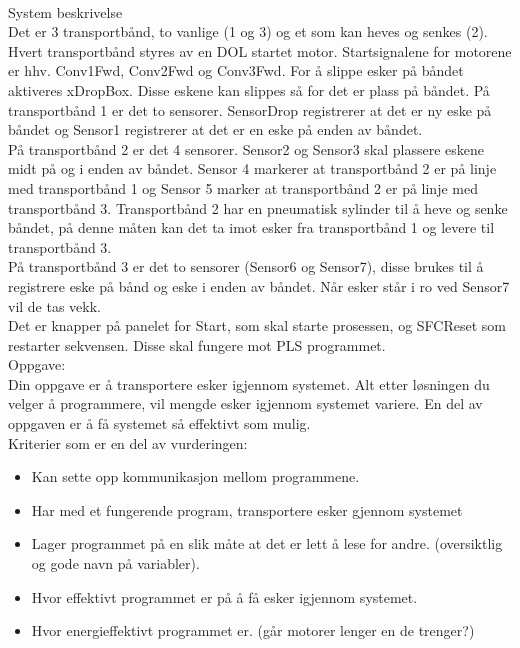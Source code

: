 

\\[0.3cm]
System beskrivelse\\[0.3cm]

Det er 3 transportbånd, to vanlige (1 og 3) og et som kan heves og senkes (2). Hvert transportbånd styres av en DOL startet motor. Startsignalene for motorene er hhv. Conv1Fwd, Conv2Fwd og Conv3Fwd. For å slippe esker på båndet aktiveres xDropBox. Disse eskene kan slippes så for det er plass på båndet. 
På transportbånd 1 er det to sensorer. SensorDrop registrerer at det er ny eske på båndet og Sensor1 registrerer at det er en eske på enden av båndet.\\[0.3cm]
 
På transportbånd 2 er det 4 sensorer. Sensor2 og Sensor3 skal plassere eskene midt på og i enden av båndet. Sensor 4 markerer at transportbånd 2 er på linje med transportbånd 1 og Sensor 5 marker at transportbånd 2 er på linje med transportbånd 3. Transportbånd 2 har en pneumatisk sylinder til å heve og senke båndet, på denne måten kan det ta imot esker fra transportbånd 1 og levere til transportbånd 3.\\[0.3cm]
  
På transportbånd 3 er det to sensorer (Sensor6 og Sensor7), disse brukes til å registrere eske på bånd og eske i enden av båndet. Når esker står i ro ved Sensor7 vil de tas vekk. \\[0.3cm]

Det er knapper på panelet for Start, som skal starte prosessen, og SFCReset som restarter sekvensen. Disse skal fungere mot PLS programmet. \\[0.3cm]

Oppgave:\\
Din oppgave er å transportere esker igjennom systemet. Alt etter løsningen du velger å programmere, vil mengde esker igjennom systemet variere. En del av oppgaven er å få systemet så effektivt som mulig. \\[0.3cm]
Kriterier som er en del av vurderingen:
\begin{itemize}[noitemsep]
	\item Kan sette opp kommunikasjon mellom programmene. 
	\item Har med et fungerende program, transportere esker gjennom systemet
	\item Lager programmet på en slik måte at det er lett å lese for andre. (oversiktlig og gode navn på variabler). 
	\item Hvor effektivt programmet er på å få esker igjennom systemet. 
	\item Hvor energieffektivt programmet er. (går motorer lenger en de trenger?)
\end{itemize}

